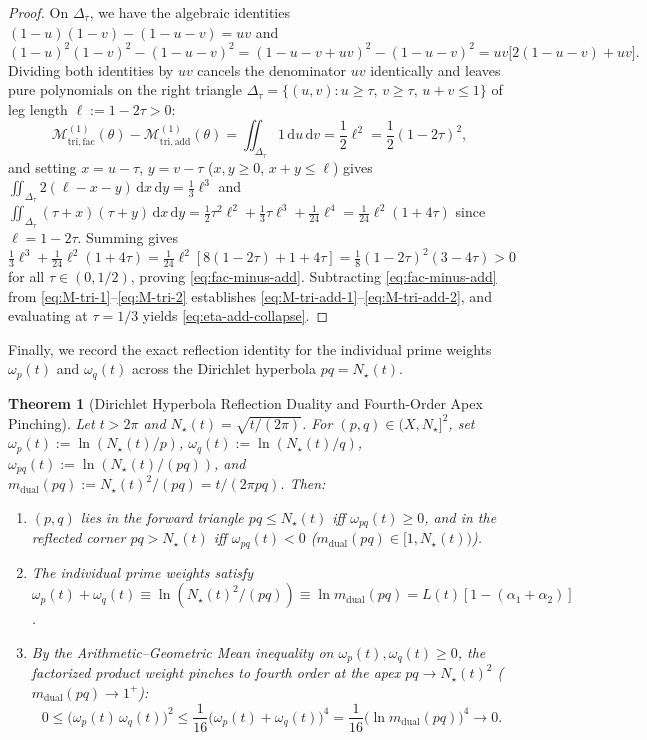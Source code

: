 \documentclass[11pt,reqno]{amsart}
\newtheorem{theorem}{Theorem}[section]
\theoremstyle{definition}
\theoremstyle{remark}
\numberwithin{equation}{section}
\newcommand{\dd}{\mathrm{d}}
\newcommand{\tri}{\mathrm{tri}}
\newcommand{\dual}{\mathrm{dual}}
\newcommand{\facw}{\mathrm{fac}}
\newcommand{\addw}{\mathrm{add}}
\begin{document}
\begin{proof}
On $\Delta_\tau$, we have the algebraic identities $(1-u)(1-v) - (1-u-v) = uv$ and
\[
(1-u)^2(1-v)^2 - (1-u-v)^2 = (1 - u - v + uv)^2 - (1 - u - v)^2 = uv\bigl[2(1 - u - v) + uv\bigr].
\]
Dividing both identities by $uv$ cancels the denominator $uv$ identically and leaves pure polynomials on the right triangle $\Delta_\tau = \{(u,v) : u \ge \tau,\, v \ge \tau,\, u+v \le 1\}$ of leg length $\ell := 1 - 2\tau > 0$:
\[
\mathcal{M}_{\tri,\facw}^{(1)}(\theta) - \mathcal{M}_{\tri,\addw}^{(1)}(\theta) = \iint_{\Delta_\tau} 1\,\dd u\,\dd v = \frac{1}{2}\ell^2 = \frac{1}{2}(1-2\tau)^2,
\]
and setting $x = u - \tau$, $y = v - \tau$ ($x,y \ge 0$, $x+y \le \ell$) gives $\iint_{\Delta_\tau} 2(\ell - x - y)\,\dd x\,\dd y = \frac{1}{3}\ell^3$ and $\iint_{\Delta_\tau} (\tau+x)(\tau+y)\,\dd x\,\dd y = \frac{1}{2}\tau^2\ell^2 + \frac{1}{3}\tau\ell^3 + \frac{1}{24}\ell^4 = \frac{1}{24}\ell^2(1 + 4\tau)$ since $\ell = 1 - 2\tau$. Summing gives $\frac{1}{3}\ell^3 + \frac{1}{24}\ell^2(1+4\tau) = \frac{1}{24}\ell^2[8(1-2\tau) + 1 + 4\tau] = \frac{1}{8}(1-2\tau)^2(3-4\tau) > 0$ for all $\tau \in (0,1/2)$, proving \eqref{eq:fac-minus-add}. Subtracting \eqref{eq:fac-minus-add} from \eqref{eq:M-tri-1}--\eqref{eq:M-tri-2} establishes \eqref{eq:M-tri-add-1}--\eqref{eq:M-tri-add-2}, and evaluating at $\tau = 1/3$ yields \eqref{eq:eta-add-collapse}.
\end{proof}

Finally, we record the exact reflection identity for the individual prime weights $\omega_p(t)$ and $\omega_q(t)$ across the Dirichlet hyperbola $pq = N_\star(t)$.

\begin{theorem}[Dirichlet Hyperbola Reflection Duality and Fourth-Order Apex Pinching]\label{thm:hyperbola-duality}
Let $t > 2\pi$ and $N_\star(t) = \sqrt{t/(2\pi)}$. For $(p,q) \in (X,N_\star]^2$, set $\omega_p(t) := \ln(N_\star(t)/p)$, $\omega_q(t) := \ln(N_\star(t)/q)$, $\omega_{pq}(t) := \ln(N_\star(t)/(pq))$, and $m_{\dual}(pq) := N_\star(t)^2/(pq) = t/(2\pi pq)$. Then:
\begin{enumerate}[label=\upshape(\alph*),leftmargin=2.2em]
\item $(p,q)$ lies in the forward triangle $pq \le N_\star(t)$ iff $\omega_{pq}(t) \ge 0$, and in the reflected corner $pq > N_\star(t)$ iff $\omega_{pq}(t) < 0$ ($m_{\dual}(pq) \in [1, N_\star(t))$).
\item The individual prime weights satisfy $\omega_p(t) + \omega_q(t) \equiv \ln(N_\star(t)^2/(pq)) \equiv \ln m_{\dual}(pq) = L(t)[1 - (\alpha_1+\alpha_2)]$.
\item By the Arithmetic--Geometric Mean inequality on $\omega_p(t),\omega_q(t) \ge 0$, the factorized product weight pinches to fourth order at the apex $pq \to N_\star(t)^2$ ($m_{\dual}(pq) \to 1^+$):
\begin{equation}\label{eq:apex-pinching}
0 \le \bigl(\omega_p(t)\,\omega_q(t)\bigr)^2 \le \frac{1}{16}\bigl(\omega_p(t) + \omega_q(t)\bigr)^4 = \frac{1}{16}\bigl(\ln m_{\dual}(pq)\bigr)^4 \longrightarrow 0.
\end{equation}
\end{enumerate}
\end{theorem}
\end{document}

